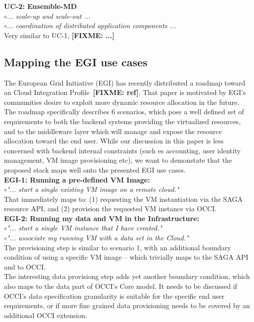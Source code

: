 \documentclass[10pt,conference,final,letterpaper,twoside,twocolumn,]{IEEEtran}
\newcommand{\I}[1]{\textit{#1}}
\newcommand{\B}[1]{\textbf{#1}}
\newcommand{\F}[1]{\B{[FIXME: #1]}}
\newcommand{\bull}{$\circ$}
\begin{document}
 \noindent
 \B{UC-2: Ensemble-MD}\\
 \bull \I{... scale-up and scale-out ... }\\
 \bull \I{... coordination of distributed application components ... }\\
 Very similar to UC-1, \F{...}

 \subsection{Mapping the EGI use cases}

 The European Grid Initiative (EGI) has recently distributed a roadmap
 toward an Cloud Integration Profile~\F{ref}.  That paper is motivated
 by EGI's communities desire to exploit more dynamic resource
 allocation in the future.  The roadmap specifically describes 6
 scenarios, which pose a well defined set of requirements to both the
 backend systems providing the virtualized resources, and to the
 middleware layer which will manage and expose the resource
 allocation toward the end user.  While our discussion in this paper
 is less concerned with backend internal constraints (such es
 accounting, user identity management, VM image provisioning etc), we
 want to demonstate that the proposed stack maps well onto the
 presented EGI use cases.\\


  \noindent
  \B{EGI-1: Running a pre-defined VM Image:}\\
  \bull \I{"... start a single existing VM image on a remote cloud."}\\
  That immediately maps to: (1) requesting the VM instantiation via
  the SAGA resource API, and (2) provision the requested VM instance
  via OCCI.\\

  \noindent
  \B{EGI-2: Running my data and VM in the Infrastructure:}\\
  \bull \I{"... start a single VM instance that I have created."}\\
  \bull \I{"... associate my running VM with a data set in the Cloud."}\\
  The provisioning step is similar to scenario 1, with an additional
  boundary condition of using a specific VM image -- which trivially
  maps to the SAGA API and to OCCI.\\
  The interesting data provisiong step adds yet another boundary
  condition, which also maps to the data part of OCCI's Core model.
  It needs to be discussed if OCCI's data specification granularity
  is suitable for the specific end user requirements, or if more fine
  grained data provisioning needs to be covered by an additional OCCI
  extension.
\end{document}

